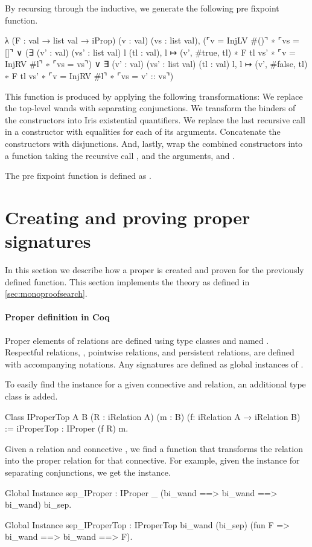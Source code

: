 \documentclass[thesis.tex]{subfiles}
\begin{document}
By recursing through the inductive, we generate the following pre fixpoint function.
\begin{coqcode}
  λ (F : val → list val → iProp) (v : val) (vs : list val),
    (⌜v = InjLV #()⌝ ∗ ⌜vs = []⌝
      ∨ (∃ (v' : val) (vs' : list val) l (tl : val), 
            l ↦ (v', #true, tl) ∗ F tl vs' ∗ 
            ⌜v = InjRV #l⌝ ∗ ⌜vs = vs⌝)
      ∨ ∃ (v' : val) (vs' : list val) (tl : val) l, 
            l ↦ (v', #false, tl) ∗ F tl vs' ∗ 
            ⌜v = InjRV #l⌝ ∗ ⌜vs = v' :: vs⌝)
\end{coqcode}
This function is produced by applying the following transformations:
We replace the top-level wands with separating conjunctions. We transform the binders of the constructors into Iris existential quantifiers. We replace the last recursive call in a constructor with equalities for each of its arguments. Concatenate the constructors with disjunctions. And, lastly, wrap the combined constructors into a function taking the recursive call , and the arguments,  and .

The pre fixpoint function is defined as .

\section{Creating and proving proper signatures}\label{sec:constrsig}
In this section we describe how a proper is created and proven for the previously defined function. This section implements the theory as defined in \cref{sec:monoproofsearch}.

\paragraph{Proper definition in Coq}
Proper elements of relations are defined using type classes and named . Respectful relations, , pointwise relations,  and persistent relations,  are defined with accompanying notations. Any signatures are defined as global instances of .

To easily find the  instance for a given connective and relation, an additional type class is added.
\begin{coqcode}
  Class IProperTop {A} {B} (R : iRelation A) (m : B) 
                   (f: iRelation A → iRelation B) := 
    iProperTop : IProper (f R) m.
\end{coqcode}
Given a relation  and connective , we find a function  that transforms the relation into the proper relation for that connective. For example, given the  instance for separating conjunctions, we get the  instance.
\begin{coqcode}
  Global Instance sep_IProper : 
    IProper _ (bi_wand ==> bi_wand ==> bi_wand) 
             bi_sep.

  Global Instance sep_IProperTop : 
    IProperTop bi_wand (bi_sep) 
               (fun F => bi_wand ==> bi_wand ==> F).
\end{coqcode}
\end{document}
